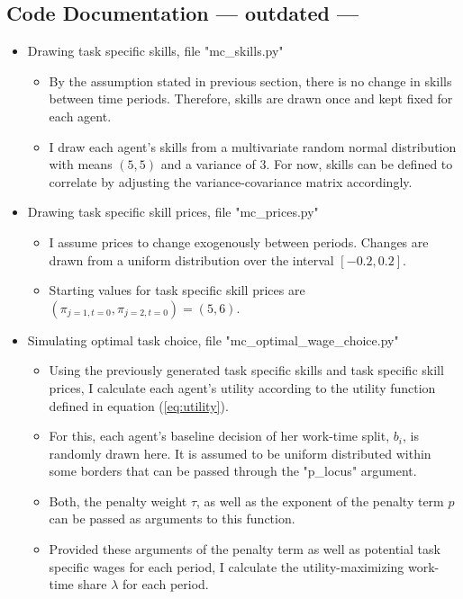 \documentclass{article}
\begin{document}
\newpage
\begin{appendix}
\section{Code Documentation --- outdated ---} \label{code_docu} %
	\begin{itemize}
		\item{Drawing task specific skills, file "mc\_skills.py"}
		\begin{itemize}
			\item{By the assumption stated in previous section, there is no change in skills between time periods. Therefore, skills are drawn once and kept fixed for each agent.}
			\item{I draw each agent's skills from a multivariate random normal distribution with means $(5, 5)$ and a variance of 3. For now, skills can be defined to correlate by adjusting the variance-covariance matrix accordingly.}
		\end{itemize}
		\item{Drawing task specific skill prices, file "mc\_prices.py"}
		\begin{itemize}
			\item{I assume prices to change exogenously between periods. Changes are drawn from a uniform distribution over the interval $[-0.2, 0.2]$.}
			\item{Starting values for task specific skill prices are $(\pi_{j=1, t=0}, \pi_{j=2, t=0})=(5, 6)$.}
		\end{itemize}
		\item{Simulating optimal task choice, file "mc\_optimal\_wage\_choice.py"}
		\begin{itemize}
			\item{Using the previously generated task specific skills and task specific skill prices, I calculate each agent's utility according to the utility function defined in equation (\ref{eq:utility}).}
			\item{For this, each agent's baseline decision of her work-time split, $b_i$, is randomly drawn here. It is assumed to be uniform distributed within some borders that can be passed through the "p\_locus" argument.}
			\item{Both, the penalty weight $\tau$, as well as the exponent of the penalty term $p$ can be passed as arguments to this function.}
			\item{Provided these arguments of the penalty term as well as potential task specific wages for each period, I calculate the utility-maximizing work-time share $\lambda$ for each period.}

\end{itemize}
\end{itemize}
\end{appendix}
\end{document}
